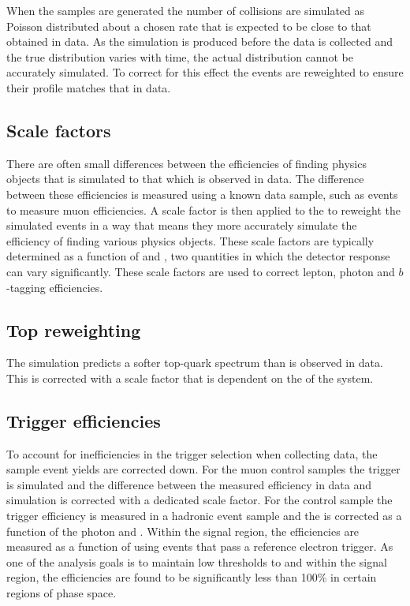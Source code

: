 When the \MC samples are generated the number of \PU collisions are
simulated as Poisson distributed about a chosen rate that is expected
to be close to that obtained in data. As the simulation is produced
before the data is collected and the true \PU distribution varies with
time, the actual distribution cannot be accurately simulated. To
correct for this effect the \MC events are reweighted to ensure their
\PU profile matches that in data. 

\subsection{Scale factors}

There are often small differences between the efficiencies of finding
physics objects that is simulated to that which is observed in data.
The difference between these efficiencies is measured using a known
data sample, such as \zmumu events to measure muon efficiencies. A
scale factor is then applied to the \MC to reweight the simulated
events in a way that means they more accurately simulate the
efficiency of finding various physics objects. These scale factors are
typically determined as a function of \pT and \eta, two quantities in
which the detector response can vary significantly. These scale
factors are used to correct lepton, photon and $b$-tagging efficiencies.

\subsection{Top \pT reweighting}%

The \ttbar simulation predicts a softer top-quark \pT spectrum than is
observed in data. This is corrected with a scale factor that is
dependent on the \pT of the \ttbar system.

\subsection{Trigger efficiencies}

To account for inefficiencies in the trigger selection when collecting
data, the \MC sample event yields are corrected down. For the muon control
samples the trigger is simulated and the difference between the
measured efficiency in data and simulation is corrected with a
dedicated scale factor. For the \gj control sample the trigger
efficiency is measured in a hadronic event sample and the \MC is
corrected as a function of the photon \pT and \eta. Within the signal
region, the efficiencies are measured as a function of \MHT using
events that pass a reference electron trigger.  As one of the analysis goals
is to maintain low thresholds to \HT and \MHT within the signal
region, the efficiencies are found to be significantly less than 100\%
in certain regions of phase space.

